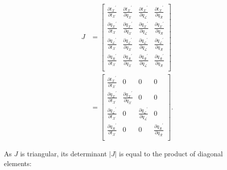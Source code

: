 \documentclass[12pt]{article}
\begin{document}
\begin{align}
	J &= \begin{bmatrix} \frac{\partial {t_\mathcal{X}}^\prime}{\partial t_\mathcal{X}} & \frac{\partial {t_\mathcal{X}}^\prime}{\partial q_\mathcal{X}} & \frac{\partial {t_\mathcal{X}}^\prime}{\partial q_\mathcal{L}} & \frac{\partial {t_\mathcal{X}}^\prime}{\partial q_\mathcal{R}} \\
			\frac{\partial {q_\mathcal{X}}^\prime}{\partial t_\mathcal{X}} & \frac{\partial {q_\mathcal{X}}^\prime}{\partial q_\mathcal{X}} & \frac{\partial {q_\mathcal{X}}^\prime}{\partial q_\mathcal{L}} & \frac{\partial {q_\mathcal{X}}^\prime}{\partial q_\mathcal{R}} \\
			\frac{\partial {q_\mathcal{L}}^\prime}{\partial t_\mathcal{X}} & \frac{\partial {q_\mathcal{L}}^\prime}{\partial q_\mathcal{X}} & \frac{\partial {q_\mathcal{L}}^\prime}{\partial q_\mathcal{L}} & \frac{\partial {q_\mathcal{L}}^\prime}{\partial q_\mathcal{R}} \\
			\frac{\partial {q_\mathcal{R}}^\prime}{\partial t_\mathcal{X}} & \frac{\partial {q_\mathcal{R}}^\prime}{\partial q_\mathcal{X}} & \frac{\partial {q_\mathcal{R}}^\prime}{\partial q_\mathcal{L}} & \frac{\partial {q_\mathcal{R}}^\prime}{\partial q_\mathcal{R}} \\ \end{bmatrix} \nonumber \\
			&= \begin{bmatrix} \frac{\partial {t_\mathcal{X}}^\prime}{\partial t_\mathcal{X}} & 0 & 0 & 0 \\
			\frac{\partial {q_\mathcal{X}}^\prime}{\partial t_\mathcal{X}} & \frac{\partial {q_\mathcal{X}}^\prime}{\partial q_\mathcal{X}} & 0 & 0 \\
			\frac{\partial {q_\mathcal{L}}^\prime}{\partial t_\mathcal{X}} & 0 & \frac{\partial {q_\mathcal{L}}^\prime}{\partial q_\mathcal{L}} & 0 \\
			\frac{\partial {q_\mathcal{R}}^\prime}{\partial t_\mathcal{X}} & 0 & 0 & \frac{\partial {q_\mathcal{R}}^\prime}{\partial q_\mathcal{R}} \\ \end{bmatrix}.
\end{align}


As $J$ is triangular, its determinant $|J|$ is equal to the product of diagonal elements:
\end{document}
